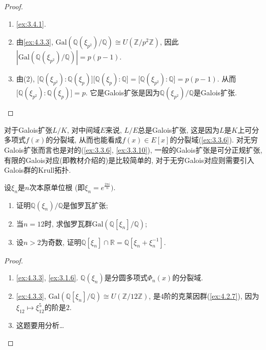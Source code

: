 \begin{proof}
    \begin{enumerate}[(1)]
        \item \ref{ex:3.4.1}.
        \item 由\ref{ex:4.3.3}, $\mathrm{Gal}(\mathbb{Q}(\xi_{p^2})/\mathbb{Q}) \cong U(\mathbb{Z}/p^2\mathbb{Z})$, 因此$|\mathrm{Gal}(\mathbb{Q}(\xi_{p^2})/\mathbb{Q})| = p(p - 1)$.
        \item 由(2), $\bigl[\mathbb{Q}(\xi_{p^2}):\mathbb{Q}(\xi_p)\bigr]\bigl[\mathbb{Q}(\xi_p):\mathbb{Q}\bigr] = \bigl[\mathbb{Q}(\xi_{p^2}):\mathbb{Q}\bigr] = p(p - 1)$. 从而$\bigl[\mathbb{Q}(\xi_{p^2}):\mathbb{Q}(\xi_p)\bigr] = p$. 它是Galois扩张是因为$\mathbb{Q}(\xi_{p^2})/\mathbb{Q}$是Galois扩张.
    \end{enumerate}
\end{proof}

\begin{remark}
    对于Galois扩张$L/K$, 对中间域$E$来说, $L/E$总是Galois扩张, 这是因为$L$是$K$上可分多项式$f(x)$的分裂域, 从而也能看成$f(x) \in E[x]$的分裂域(\ref{ex:3.3.6}). 对无穷Galois扩张而言也是对的(\ref{ex:3.3.6}, \ref{ex:3.3.10}), 一般的Galois扩张是可分正规扩张, 有限的Galois对应(即教材介绍的)是比较简单的, 对于无穷Galois对应则需要引入Galois群的Krull拓扑.
\end{remark}

\begin{problem}
    设$\xi_n$是$n$次本原单位根 (即$\xi_n = e^{\frac{2\pi i}n})$.
    \begin{enumerate}[(1)]
        \item 证明$\mathbb{Q}(\xi_n)/\mathbb{Q}$是伽罗瓦扩张;
        \item 当$n = 12$时, 求伽罗瓦群$\mathrm{Gal}(\mathbb{Q}[\xi_n]/\mathbb{Q})$;
        \item 设$n > 2$为奇数, 证明$\mathbb{Q}[\xi_n] \cap \mathbb{R} = \mathbb{Q}[\xi_n + \xi_n^{-1}]$.
    \end{enumerate}
\end{problem}

\begin{proof}
    \begin{enumerate}[(1)]
        \item \ref{ex:4.3.3}, \ref{ex:3.1.6}. $\mathbb{Q}(\xi_n)$是分圆多项式$\Phi_n(x)$的分裂域.
        \item \ref{ex:4.3.3}, $\mathrm{Gal}(\mathbb{Q}[\xi_n]/\mathbb{Q}) \cong U(\mathbb{Z}/12\mathbb{Z})$, 是$4$阶的克莱因群(\ref{ex:4.2.7}), 因为$\xi_{12} \mapsto \xi_{12}^5$的阶是$2$.
        \item 这题要用分析\dots
    \end{enumerate}
\end{proof}